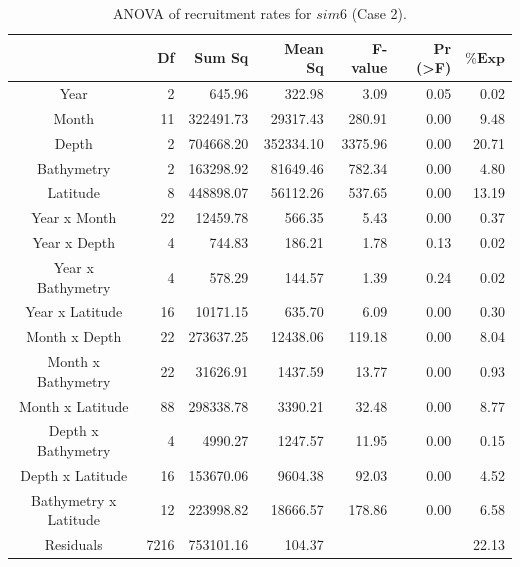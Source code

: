 \begin{table}[H]
\centering
\begin{adjustbox}{width=0.9\textwidth}
\small
\begin{tabular}{c|r|r|r|r|r|r}
\hline
                                  &
	\textbf{Df}                   &
	\textbf{Sum Sq}               &
	\textbf{Mean Sq}              &
	\textbf{F-value}    		   &
	\textbf{Pr (\textgreater{F})} &
	$\mathbf{\% Exp}$      \\
\hline
Year                  & 2    & 645.96    & 322.98    & 3.09    & 0.05                & 0.02  \\
Month                 & 11   & 322491.73 & 29317.43  & 280.91  & 0.00                & 9.48  \\
Depth                 & 2    & 704668.20 & 352334.10 & 3375.96 & 0.00                & 20.71 \\
Bathymetry            & 2    & 163298.92 & 81649.46  & 782.34  & 0.00                & 4.80  \\
Latitude              & 8    & 448898.07 & 56112.26  & 537.65  & 0.00                & 13.19 \\
Year x Month          & 22   & 12459.78  & 566.35    & 5.43    & 0.00                & 0.37  \\
Year x Depth          & 4    & 744.83    & 186.21    & 1.78    & 0.13                & 0.02  \\
Year x Bathymetry     & 4    & 578.29    & 144.57    & 1.39    & 0.24                & 0.02  \\
Year x Latitude       & 16   & 10171.15  & 635.70    & 6.09    & 0.00                & 0.30  \\
Month x Depth         & 22   & 273637.25 & 12438.06  & 119.18  & 0.00                & 8.04  \\
Month x Bathymetry    & 22   & 31626.91  & 1437.59   & 13.77   & 0.00                & 0.93  \\
Month x Latitude      & 88   & 298338.78 & 3390.21   & 32.48   & 0.00                & 8.77  \\
Depth x Bathymetry    & 4    & 4990.27   & 1247.57   & 11.95   & 0.00                & 0.15  \\
Depth x Latitude      & 16   & 153670.06 & 9604.38   & 92.03   & 0.00                & 4.52  \\
Bathymetry x Latitude & 12   & 223998.82 & 18666.57  & 178.86  & 0.00                & 6.58  \\
Residuals             & 7216 & 753101.16 & 104.37    &         &                     & 22.13 \\
\hline
\end{tabular}
\end{adjustbox}
\caption{ANOVA of recruitment rates for $sim 6$ (Case 2).}
\label{ANOVAsim6}
\end{table}

